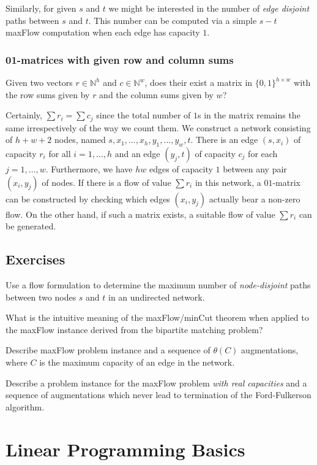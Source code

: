 \documentclass{article}
\newcommand{\Problem}[1]{\par\vspace{3mm}\noindent{\bf Problem{\hspace{1mm}}#1}\hspace{1mm}}
\begin{document}
Similarly, for given $s$ and $t$ we might be interested in the number of \emph{edge disjoint} paths between $s$ and $t$. This number can be computed via a simple $s-t$ maxFlow computation when each edge has capacity $1$.

\subsubsection{01-matrices with given row and column sums}
Given two vectors $r\in \mathbb{N}^h$ and $c\in \mathbb{N}^w$, does their exist a matrix in $\{0,1\}^{h\times w}$ with the row sums given by $r$ and the column sums given by $w$?

Certainly, $\sum r_i=\sum c_j$ since the total number of $1$s in the matrix remains the same irrespectively of the way we count them. We construct a network consisting of $h+w+2$ nodes, named $s,x_1, \dots, x_h, y_1,\dots,y_w,t$. There is an edge $(s,x_i)$ of capacity $r_i$ for all $i=1,\dots,h$ and an edge $(y_j,t)$ of capacity $c_j$ for each $j=1,\dots, w$. Furthermore, we have $hw$ edges of capacity $1$ between any pair $(x_i, y_j)$ of nodes. If there is a flow of value $\sum r_i$ in this network, a $01$-matrix can be constructed by checking which edges $(x_i, y_j)$ actually bear a non-zero flow. On the other hand, if such a matrix exists, a suitable flow of value $\sum r_i$ can be generated.
\subsection{Exercises}
\Problem{1}
Use a flow formulation to determine the maximum number of \emph{node-disjoint} paths between two nodes $s$ and $t$ in an undirected network.

\Problem{2}
What is the intuitive meaning of the maxFlow/minCut theorem when applied to the maxFlow instance derived from the bipartite matching problem?

\Problem{3}
Describe maxFlow problem instance and a sequence of $\theta(C)$ augmentations, where $C$
is the maximum capacity of an edge in the network.

\Problem{4}
Describe a problem instance for the maxFlow problem \emph{with real capacities} and a sequence of augmentations which never lead to termination of the Ford-Fulkerson algorithm.

\newpage


\section{Linear Programming Basics}
\end{document}

